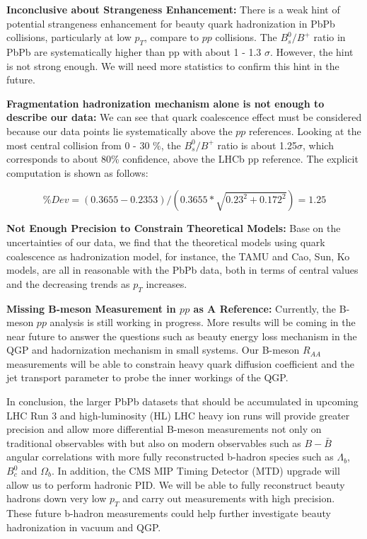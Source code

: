 \textbf{Inconclusive about Strangeness Enhancement:} There is a weak hint of potential strangeness enhancement for beauty quark hadronization in PbPb collisions, particularly at low $p_T$, compare to $pp$ collisions. The $B^0_s/B^+$ ratio in PbPb are systematically higher than pp with about 1 - 1.3 $\sigma$. However, the hint is not strong enough. We will need more statistics to confirm this hint in the future.

\textbf{Fragmentation hadronization mechanism alone is not enough to describe our data:} We can see that quark coalescence effect must be considered because our data points lie systematically above the $pp$ references. Looking at the most central collision from 0 - 30 \%, the $B^0_s/B^+$ ratio is about 1.25$\sigma$, which corresponds to about 80\% confidence, above the LHCb pp reference. The explicit computation is shown as follows:

\begin{equation}
\% Dev = (0.3655 - 0.2353)/(0.3655 * \sqrt{0.23^2 + 0.172^2}) = 1.25 
\end{equation}


\textbf{Not Enough Precision to Constrain Theoretical Models:} Base on the uncertainties of our data, we find that the theoretical models using quark coalescence as hadronization model, for instance, the TAMU and Cao, Sun, Ko models, are all in reasonable with the PbPb data, both in terms of central values and the decreasing trends as $p_T$ increases.

\textbf{Missing B-meson Measurement in $pp$ as A Reference:} Currently, the B-meson $pp$ analysis is still working in progress. More results will be coming in the near future to answer the questions such as beauty energy loss mechanism in the QGP and hadornization mechanism in small systems. Our B-meson $R_{AA}$ measurements will be able to constrain heavy quark diffusion coefficient and the jet transport parameter to probe the inner workings of the QGP.

In conclusion, the larger PbPb datasets that should be accumulated in upcoming LHC Run 3 and high-luminosity (HL) LHC heavy ion runs will provide greater precision and allow more differential B-meson measurements not only on traditional observables with but also on modern observables such as $B-\bar B$ angular correlations with more fully reconstructed b-hadron species such as $\Lambda_b$, $B^0_c$ and $\Omega_b$. In addition, the CMS MIP Timing Detector (MTD) upgrade \cite{CMSMTD} will allow us to perform hadronic PID. We will be able to fully reconstruct beauty hadrons down very low $p_T$ and carry out measurements with high precision. These future b-hadron measurements could help further investigate beauty hadronization in vacuum and QGP.


